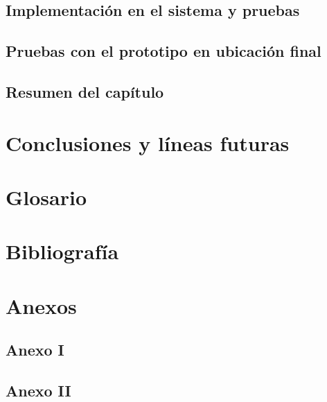 \documentclass[12pt]{article}
\begin{document}
	\subsection[Implementación en el sistema y pruebas]{Implementación en el sistema y pruebas}
	\subsection[Pruebas con el prototipo en ubicación final]{Pruebas con el prototipo en ubicación final}
	\subsection[Resumen del capítulo]{Resumen del capítulo}
	
	\section[Conclusiones y líneas futuras]{Conclusiones y líneas futuras}
	
	\section*{Glosario}
	
	\section*{Bibliografía}
	
	\section*{Anexos}
	
	\subsection*{Anexo I}
	
	\subsection*{Anexo II}
	
\end{document}
